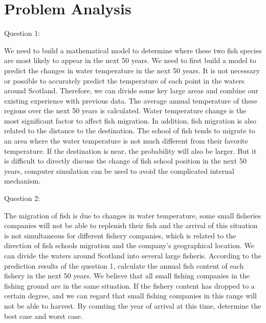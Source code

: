 \documentclass{mcmthesis}
\numberwithin{figure}{section}
\numberwithin{table}{section}
\begin{document}
\section{Problem Analysis}
Question 1: 

We need to build a mathematical model to determine where these two fish species are most likely to appear in the next 50 years. We need to first build a model to predict the changes in water temperature in the next 50 years. It is not necessary or possible to accurately predict the temperature of each point in the waters around Scotland. Therefore, we can divide some key large areas and combine our existing experience with previous data. The average annual temperature of these regions over the next 50 years is calculated. Water temperature change is the most significant factor to affect fish migration. In addition, fish migration is also related to the distance to the destination. The school of fish tends to migrate to an area where the water temperature is not much different from their favorite temperature. If the destination is near, the probability will also be larger. But it is difficult to directly discuss the change of fish school position in the next 50 years, computer simulation can be used to avoid the complicated internal mechanism. \cite{REF4}

Question 2:

The migration of fish is due to changes in water temperature, some small fisheries companies will not be able to replenish their fish and the arrival of this situation is not simultaneous for different fishery companies, which is related to the direction of fish schools migration and the company's geographical location. We can divide the waters around Scotland into several large fisheris. According to the prediction results of the question 1, calculate the annual fish content of each fishery in the next 50 years. We believe that all small fishing companies in the fishing ground are in the same situation. If the fishery content has dropped to a certain degree, and we can regard that small fishing companies in this range will not be able to harvest. By counting the year of arrival at this time, determine the best case and worst case.
\end{document}
